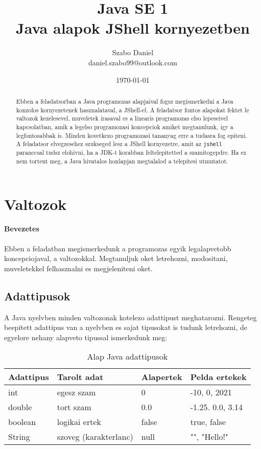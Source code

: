 \documentclass{article}
\title{%
Java SE 1 \\
\large Java alapok JShell kornyezetben}
\author{Szabo Daniel\\daniel.szabo99@outlook.com}
\date{\today}
\begin{document}
\maketitle
\begin{abstract}
Ebben a feladatsorban a Java programozas alapjaival fogsz megismerkedni a Java konzolos kornyezetenek hasznalataval, a JShell-el. A feladatsor fontos alapokat fektet le valtozok kezelesevel, muveletek irasaval es a linearis programozas elso lepeseivel kapcsolatban, amik a legelso programozasi koncepciok amiket megtanulunk, igy a legfontosabbak is. Minden kovetkezo programozasi tananyag erre a tudasra fog epiteni. A feladatsor elvegzesehez szukseged lesz a JShell kornyezetre, amit az \lstinline{jshell} paranccsal tudsz elohivni, ha a JDK-t korabban feltelepitetted a szamitogepdre. Ha ez nem tortent meg, a Java hivatalos honlapjan megtalalod a telepitesi utmutatot.
\end{abstract}

\newpage

\tableofcontents{}

\newpage

\section{Valtozok}

\paragraph{Bevezetes}

Ebben a feladatban megismerkedunk a programozas egyik legalapvetobb koncepciojaval, a valtozokkal. Megtanuljuk oket letrehozni, modositani, muveletekkel felhasznalni es megjeleniteni oket.

\subsection{Adattipusok}

A Java nyelvben minden valtozonak kotelezo adattipust meghatarozni. Rengeteg beepitett adattipus van a nyelvben es sajat tipusokat is tudunk letrehozni, de egyelore nehany alapveto tipussal ismerkedunk meg:

\begin{table}[H]
    \begin{tabular}{|l|l|l|l|}
        \hline
        \textbf{Adattipus} & \textbf{Tarolt adat}  & \textbf{Alapertek} & \textbf{Pelda ertekek} \\ \hline
        int                & egesz szam            & 0                  & -10, 0, 2021           \\ \hline
        double              & tort szam             & 0.0                & -1.25. 0.0, 3.14       \\ \hline
        boolean            & logikai ertek         & false              & true, false            \\ \hline
        String             & szoveg (karakterlanc) & null               & "", "Hello!"           \\ \hline
    \end{tabular}
    \caption{Alap Java adattipusok}
    \label{tab:adattipusok}
\end{table}
\end{document}
